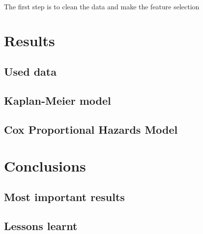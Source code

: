 \documentclass[11pt]{article} %
\begin{document}
    The first step is to clean the data and make the feature selection


\section{Results}
  \label{sec:results}

  \subsection{Used data}

  \subsection{Kaplan-Meier model}

  \subsection{Cox Proportional Hazards Model}

\section{Conclusions}
  \label{sec:conclusions}

  \subsection{Most important results}

  \subsection{Lessons learnt}
\end{document}
